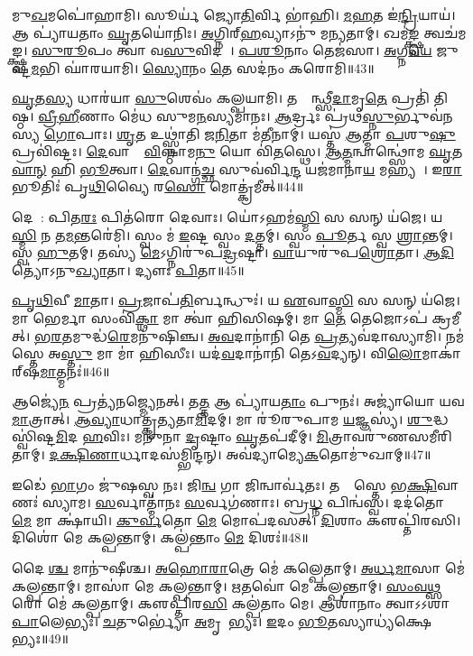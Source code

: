 𑌮𑍁\ul{𑌖}𑌮𑌪𑍋॑𑌹𑌾𑌮𑌿।
𑌸𑍂𑌰𑍍𑌯॑ 𑌜𑍍𑌯𑍋\ul{𑌤𑌿}𑌰𑍍𑌵𑌿 𑌭𑌾॑𑌹𑌿।
\ul{𑌮}\ul{𑌹}𑌤 𑌇॑\ul{𑌨𑍍𑌦𑍍𑌰𑌿}𑌯𑌾𑌯॑।
𑌆 𑌪𑍍𑌯𑌾॑𑌯𑌤𑌾𑌂 \ul{𑌘𑍃}𑌤𑌯𑍋॑𑌨𑌿𑌃।
\ul{𑌅}𑌗𑍍𑌨𑌿𑌰𑍍‌\mbox{}\ul{𑌹}𑌵𑍍𑌯𑌾𑌽𑌨𑍁॑ 𑌮𑌨𑍍𑌯𑌤𑌾𑌮𑍍।
𑌖𑌮॑\ul{𑌙𑍍𑌕𑍍𑌷𑍍𑌵} 𑌤𑍍𑌵𑌚॑𑌮𑌙𑍍𑌕𑍍𑌷𑍍𑌵।
\ul{𑌸𑍁}\ul{𑌰𑍂}𑌪𑌂 𑌤𑍍𑌵𑌾॑ 𑌵\ul{𑌸𑍁}𑌵𑌿𑌦𑌮𑍍᳚।
\ul{𑌪}\ul{𑌶𑍂}𑌨𑌾𑌂 𑌤𑍇𑌜॑𑌸𑌾।
\ul{𑌅}𑌗𑍍𑌨\ul{𑌯𑍇} 𑌜𑍁𑌷𑍍𑌟॑\ul{𑌮}𑌭𑌿 𑌘𑌾॑𑌰𑌯𑌾𑌮𑌿।
\ul{𑌸𑍍𑌯𑍋}𑌨𑌂 \ul{𑌤𑍇} 𑌸𑌦॑𑌨𑌂 𑌕𑌰𑍋𑌮𑌿॥43॥

\ul{𑌘𑍃}𑌤\ul{𑌸𑍍𑌯} 𑌧𑌾𑌰॑𑌯𑌾 \ul{𑌸𑍁}𑌶𑍇𑌵𑌂॑ 𑌕𑌲𑍍𑌪𑌯𑌾𑌮𑌿।
𑌤𑌸𑍍𑌮𑌿᳚𑌨𑍍𑌥𑍍𑌸𑍀\ul{𑌦𑌾}𑌮𑍃\ul{𑌤𑍇} 𑌪𑍍𑌰𑌤𑌿॑ 𑌤𑌿𑌷𑍍𑌠।
\ul{𑌵𑍍𑌰𑍀}\ul{𑌹𑍀}𑌣𑌾𑌂 𑌮𑍇॑𑌧 𑌸𑍁𑌮\ul{𑌨}𑌸𑍍𑌯𑌮𑌾॑𑌨𑌃।
\ul{𑌆}𑌰𑍍𑌦𑍍𑌰𑌃 𑌪𑍍𑌰॑𑌥\ul{𑌸𑍍𑌨𑍁}𑌰𑍍𑌭𑍁𑌵॑𑌨𑌸𑍍𑌯 \ul{𑌗𑍋}𑌪𑌾𑌃।
\ul{𑌶𑍃}𑌤 𑌉𑌥𑍍𑌸𑍍𑌨𑌾॑𑌤𑌿 𑌜\ul{𑌨𑌿}𑌤𑌾 𑌮॑\ul{𑌤𑍀}𑌨𑌾𑌮𑍍।
𑌯𑌸𑍍𑌤॑ \ul{𑌆}𑌤𑍍𑌮𑌾 \ul{𑌪}𑌶𑍁\ul{𑌷𑍁} 𑌪𑍍𑌰𑌵𑌿॑𑌷𑍍𑌟𑌃।
\ul{𑌦𑍇}𑌵𑌾𑌨𑌾𑌂᳚ \ul{𑌵𑌿}𑌷𑍍𑌠𑌾𑌮\ul{𑌨𑍁} 𑌯𑍋 𑌵𑌿॑\ul{𑌤}𑌸𑍍𑌥𑍇।
\ul{𑌆}\ul{𑌤𑍍𑌮}𑌨𑍍𑌵𑌾𑌨𑍍𑌥𑍍𑌸𑍋॑𑌮 \ul{𑌘𑍃}𑌤\ul{𑌵𑌾}\ul{𑌨𑍍} 𑌹𑌿 \ul{𑌭𑍂}𑌤𑍍𑌵𑌾।
\ul{𑌦𑍇}𑌵𑌾𑌨𑍍𑌗॑\ul{𑌚𑍍𑌛} 𑌸𑍁𑌵॑𑌰𑍍𑌵𑌿\ul{𑌨𑍍𑌦} 𑌯𑌜॑𑌮𑌾𑌨𑌾\ul{𑌯} 𑌮𑌹𑍍𑌯𑌮𑍍᳚।
𑌇\ul{𑌰𑌾} 𑌭𑍂𑌤𑌿𑌃॑ 𑌪𑍃\ul{𑌥𑌿}𑌵𑍍𑌯𑍈 𑌰\ul{𑌸𑍋} 𑌮𑍋𑌤𑍍𑌕𑍍𑌰॑𑌮𑍀𑌤𑍍॥44॥

𑌦𑍇𑌵𑌾᳚: 𑌪𑌿𑌤\ul{𑌰𑌃} 𑌪𑌿𑌤॑𑌰𑍋 𑌦𑍇𑌵𑌾𑌃।
𑌯𑍋॑𑌽𑌹𑌮॑\ul{𑌸𑍍𑌮𑌿} 𑌸 𑌸𑌨𑍍 𑌯॑𑌜𑍇।
𑌯𑌸𑍍𑌯𑌾᳚\ul{𑌸𑍍𑌮𑌿} 𑌨 𑌤\ul{𑌮}𑌨𑍍𑌤𑌰𑍇॑𑌮𑌿।
𑌸𑍍𑌵𑌂 𑌮॑ \ul{𑌇}𑌷𑍍𑌟 𑌸𑍍𑌵𑌂 \ul{𑌦}𑌤𑍍𑌤𑌮𑍍।
𑌸𑍍𑌵𑌂 \ul{𑌪𑍂}𑌰𑍍𑌤 𑌸𑍍𑌵 \ul{𑌶𑍍𑌰𑌾}𑌨𑍍𑌤𑌮𑍍।
𑌸𑍍𑌵 \ul{𑌹𑍁}𑌤𑌮𑍍।
𑌤𑌸𑍍𑌯॑ \ul{𑌮𑍇}\-𑌽𑌗𑍍𑌨𑌿𑌰𑍁॑𑌪\ul{𑌦𑍍𑌰}𑌷𑍍𑌟𑌾।
\ul{𑌵𑌾}𑌯𑍁𑌰𑍁॑𑌪\ul{𑌶𑍍𑌰𑍋}𑌤𑌾।
\ul{𑌆}\ul{𑌦𑌿}𑌤𑍍𑌯𑍋॑\-𑌽𑌨𑍁\ul{𑌖𑍍𑌯𑌾}𑌤𑌾।
𑌦𑍍𑌯𑍗𑌃 \ul{𑌪𑌿}𑌤𑌾॥45॥

\ul{𑌪𑍃}\ul{𑌥𑌿}𑌵𑍀 \ul{𑌮𑌾}𑌤𑌾।
\ul{𑌪𑍍𑌰}𑌜𑌾𑌪॑\ul{𑌤𑌿}𑌰𑍍𑌬𑌨𑍍𑌧𑍁𑌃॑।
𑌯 \ul{𑌏}𑌵𑌾\ul{𑌸𑍍𑌮𑌿} 𑌸 𑌸𑌨𑍍 𑌯॑𑌜𑍇।
𑌮𑌾 𑌭𑍇𑌰𑍍𑌮𑌾 𑌸𑌂𑌵𑌿॑\ul{𑌕𑍍𑌥𑌾} 𑌮𑌾 𑌤𑍍𑌵𑌾॑ 𑌹𑌿𑌸𑌿𑌷𑌮𑍍।
𑌮𑌾 \ul{𑌤𑍇} 𑌤𑍇𑌜𑍋𑌽𑌪॑ 𑌕𑍍𑌰𑌮𑍀𑌤𑍍।
\ul{𑌭}\ul{𑌰}𑌤𑌮𑍁𑌦𑍍𑌧॑\ul{𑌰𑍇}𑌮𑌨𑍁॑𑌷𑌿𑌞𑍍𑌚।
\ul{𑌅}\ul{𑌵}𑌦𑌾𑌨𑌾॑𑌨𑌿 𑌤𑍇 \ul{𑌪𑍍𑌰}𑌤𑍍𑌯𑌵॑𑌦𑌾𑌸𑍍𑌯𑌾𑌮𑌿।
𑌨𑌮॑𑌸𑍍𑌤𑍇 𑌅\ul{𑌸𑍍𑌤𑍁} 𑌮𑌾 𑌮𑌾॑ 𑌹𑌿𑌸𑍀𑌃।
𑌯𑌦॑\ul{𑌵}𑌦𑌾𑌨𑌾॑𑌨𑌿 𑌤𑍇𑌽\ul{𑌵}𑌦𑍍𑌯𑌨𑍍।
𑌵𑌿\ul{𑌲𑍋}𑌮𑌾𑌕𑌾॑𑌰𑍍‌\mbox{}𑌷\ul{𑌮𑌾}𑌤𑍍𑌮𑌨𑌃॑॥46॥

𑌆𑌜𑍍𑌯𑍇॑\ul{𑌨} 𑌪𑍍𑌰𑌤𑍍𑌯॑𑌨𑌜𑍍𑌮𑍍𑌯𑍇𑌨𑌤𑍍।
𑌤\ul{𑌤𑍍𑌤} 𑌆 𑌪𑍍𑌯𑌾॑𑌯\ul{𑌤𑌾𑌂} 𑌪𑍁𑌨𑌃॑।
𑌅𑌜𑍍𑌯𑌾॑𑌯𑍋 𑌯𑌵\ul{𑌮𑌾}𑌤𑍍𑌰𑌾𑌤𑍍।
\ul{𑌆}\ul{𑌵𑍍𑌯𑌾}𑌧𑌾𑌤𑍍𑌕𑍃॑𑌤𑍍𑌯𑌤𑌾\ul{𑌮𑌿}𑌦𑌮𑍍।
𑌮𑌾 𑌰𑍂॑𑌰𑍁𑌪𑌾𑌮 \ul{𑌯}𑌜𑍍𑌞𑌸𑍍𑌯॑।
\ul{𑌶𑍁}𑌦𑍍𑌧 𑌸𑍍𑌵𑌿॑𑌷𑍍𑌟\ul{𑌮𑌿}𑌦 \ul{𑌹}𑌵𑌿𑌃।
𑌮𑌨𑍁॑𑌨𑌾 \ul{𑌦𑍃}𑌷𑍍𑌟𑌾𑌂 \ul{𑌘𑍃}𑌤𑌪॑𑌦𑍀𑌮𑍍।
\ul{𑌮𑌿}𑌤𑍍𑌰𑌾𑌵𑌰𑍁॑𑌣𑌸𑌮𑍀𑌰𑌿𑌤𑌾𑌮𑍍।
\ul{𑌦}\ul{𑌕𑍍𑌷𑌿}\ul{𑌣𑌾}𑌰𑍍𑌧𑌾𑌦𑌸॑𑌮𑍍𑌭𑌿𑌨𑍍𑌦𑌨𑍍।
𑌅𑌵॑𑌦𑍍𑌯𑌾𑌮𑍍𑌯𑍇\-\ul{𑌕}𑌤𑍋𑌮𑍁॑𑌖𑌾𑌮𑍍॥47॥

𑌇𑌡𑍇॑ \ul{𑌭𑌾}𑌗𑌂 𑌜𑍁॑𑌷𑌸𑍍𑌵 𑌨𑌃।
𑌜𑌿\ul{𑌨𑍍𑌵} 𑌗𑌾 𑌜𑌿𑌨𑍍𑌵𑌾𑌰𑍍𑌵॑𑌤𑌃।
𑌤𑌸𑍍𑌯𑌾᳚𑌸𑍍𑌤𑍇 𑌭\ul{𑌕𑍍𑌷𑌿}𑌵𑌾𑌣𑌃॑ 𑌸𑍍𑌯𑌾𑌮।
\ul{𑌸}𑌰𑍍𑌵𑌾𑌤𑍍𑌮𑌾॑𑌨𑌃 \ul{𑌸}𑌰𑍍𑌵𑌗॑𑌣𑌾𑌃।
𑌬𑍍𑌰\ul{𑌧𑍍𑌨} 𑌪𑌿𑌨𑍍𑌵॑𑌸𑍍𑌵।
𑌦𑌦॑𑌤𑍋 \ul{𑌮𑍇} 𑌮𑌾 𑌕𑍍𑌷𑌾॑𑌯𑌿।
\ul{𑌕𑍁}\ul{𑌰𑍍𑌵}𑌤𑍋 \ul{𑌮𑍇} 𑌮𑍋𑌪॑𑌦𑌸𑌤𑍍।
\ul{𑌦𑌿}𑌶𑌾𑌂 𑌕𑍢𑌪𑍍𑌤𑌿॑𑌰𑌸𑌿।
𑌦𑌿𑌶𑍋॑ 𑌮𑍇 𑌕𑌲𑍍𑌪𑌨𑍍𑌤𑌾𑌮𑍍।
𑌕𑌲𑍍𑌪॑𑌨𑍍𑌤𑌾𑌂 \ul{𑌮𑍇} 𑌦𑌿𑌶𑌃॑॥48॥

𑌦𑍈𑌵𑍀᳚\ul{𑌶𑍍𑌚} 𑌮𑌾𑌨𑍁॑𑌷𑍀𑌶𑍍𑌚।
\ul{𑌅}\ul{𑌹𑍋}\ul{𑌰𑌾}𑌤𑍍𑌰𑍇 𑌮𑍇॑ 𑌕𑌲𑍍𑌪𑍇𑌤𑌾𑌮𑍍।
\ul{𑌅}\ul{𑌰𑍍𑌧}\ul{𑌮𑌾}𑌸𑌾 𑌮𑍇॑ 𑌕𑌲𑍍𑌪𑌨𑍍𑌤𑌾𑌮𑍍।
𑌮𑌾𑌸𑌾॑ 𑌮𑍇 𑌕𑌲𑍍𑌪𑌨𑍍𑌤𑌾𑌮𑍍।
\ul{𑌋}𑌤𑌵𑍋॑ 𑌮𑍇 𑌕𑌲𑍍𑌪𑌨𑍍𑌤𑌾𑌮𑍍।
\ul{𑌸𑌂}\ul{𑌵}\ul{𑌥𑍍𑌸}𑌰𑍋 𑌮𑍇॑ 𑌕𑌲𑍍𑌪𑌤𑌾𑌮𑍍।
𑌕𑍢𑌪𑍍𑌤𑌿॑𑌰\ul{𑌸𑌿} 𑌕𑌲𑍍𑌪॑𑌤𑌾𑌂 𑌮𑍇।
𑌆𑌶𑌾॑𑌨𑌾𑌂 𑌤𑍍𑌵𑌾\-𑌽𑌽𑌶𑌾\ul{𑌪𑌾}𑌲𑍇𑌭𑍍𑌯𑌃॑।
\ul{𑌚}𑌤𑍁𑌰𑍍𑌭𑍍𑌯𑍋॑ \ul{𑌅}𑌮𑍃𑌤𑍇᳚𑌭𑍍𑌯𑌃।
\ul{𑌇}𑌦𑌂 \ul{𑌭𑍂}𑌤𑌸𑍍𑌯𑌾𑌧𑍍𑌯॑𑌕𑍍𑌷𑍇𑌭𑍍𑌯𑌃॥49॥

